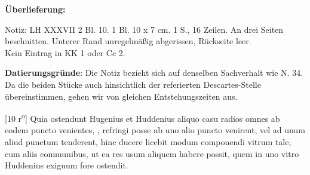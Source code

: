       
               
                \begin{ledgroupsized}[r]{120mm}
                \footnotesize 
                \pstart                
                \noindent\textbf{\"{U}berlieferung:}   
                \pend
                \end{ledgroupsized}
            
              
                            \begin{ledgroupsized}[r]{114mm}
                            \footnotesize 
                            \pstart \parindent -6mm
                            Notiz: LH XXXVII 2 Bl. 10. 1 Bl. 10 x 7 cm. 1 S., 16 Zeilen. An drei Seiten beschnitten. Unterer Rand unregelm\"{a}ßig abgerissen, R\"{u}ckseite leer.\\Kein Eintrag in KK 1 oder Cc 2. \pend
                            \end{ledgroupsized}
                \vspace*{5mm}
                \begin{ledgroup}
                \footnotesize 
                \pstart
            \noindent\footnotesize{\textbf{Datierungsgr\"{u}nde}: Die Notiz bezieht sich auf denselben Sachverhalt wie N. 34. Da die beiden St\"{u}cke auch hinsichtlich der referierten Descartes-Stelle \"{u}bereinstimmen, gehen wir von gleichen Entstehungszeiten aus.}
                \pend
                \end{ledgroup}
            
                \vspace*{8mm}
                \pstart 
                \normalsize
            [10 r\textsuperscript{o}]  Quia ostendunt Hugenius\protect{} et Huddenius\protect{} aliquo casu radios omnes ab eodem puncto venientes, , refringi posse  ab uno alio puncto venirent, vel ad unum aliud punctum tenderent, hinc ducere licebit modum componendi vitrum tale, cum aliis communibus, ut ea res usum aliquem habere possit, quem in uno vitro Huddenius\protect{} exiguum fore ostendit. \pend 